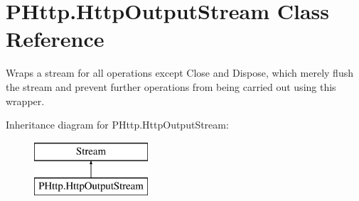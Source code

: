 \hypertarget{class_p_http_1_1_http_output_stream}{}\section{P\+Http.\+Http\+Output\+Stream Class Reference}
\label{class_p_http_1_1_http_output_stream}


Wraps a stream for all operations except Close and Dispose, which merely flush the stream and prevent further operations from being carried out using this wrapper.  


Inheritance diagram for P\+Http.\+Http\+Output\+Stream\+:\begin{figure}[H]
\begin{center}
\leavevmode
\includegraphics[height=2.000000cm]{class_p_http_1_1_http_output_stream}
\end{center}
\end{figure}
